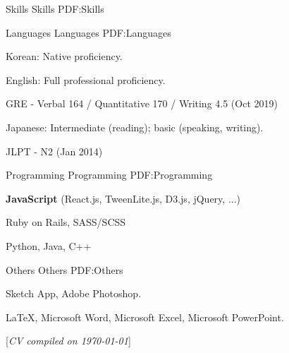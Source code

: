 \documentclass[letterpaper,MMMyyyy,nonstopmode]{template}
\newcommand{\CVNote}{CV compiled on {\today}}
\begin{document}
\begin{Body}
\BigGap
\Section
{Skills}
{Skills}
{PDF:Skills}

\SubSection
{Languages}
{Languages}
{PDF:Languages}

\BigGap
\BulletItem
Korean: Native proficiency.

\Gap
\BulletItem
English: Full professional proficiency.
\begin{Detail}
\SubBulletItem
GRE - Verbal 164 / Quantitative 170 / Writing 4.5 (Oct 2019)
\end{Detail}

\Gap
\BulletItem
Japanese: Intermediate (reading); basic (speaking, writing).
\begin{Detail}
\SubBulletItem
JLPT - N2 (Jan 2014)
\end{Detail}

\BigGap
\SubSection
{Programming}
{Programming}
{PDF:Programming}

\BigGap
\BulletItem
\textbf{JavaScript} (React.js, TweenLite.js, D3.js, jQuery, ...)

\Gap
\BulletItem
Ruby on Rails,
SASS/SCSS

\Gap
\BulletItem
Python, Java, C++

\BigGap
\SubSection
{Others}
{Others}
{PDF:Others}

\BigGap
\BulletItem
Sketch App,
Adobe Photoshop.

\Gap
\BulletItem
{\LaTeX},
Microsoft Word,
Microsoft Excel,
Microsoft PowerPoint.

\end{Body}


\BigGap
\UseNoteFont%
\null\hfill%
[\textit{\CVNote}]
\end{document}
